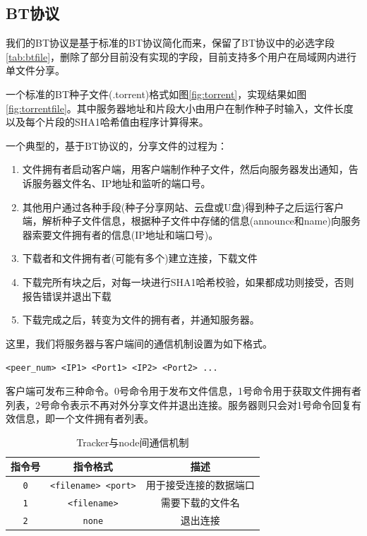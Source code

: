 \documentclass[thesis]{thesis}
\begin{document}
	\subsection{BT协议}
	\label{sub:bt}
	我们的BT协议是基于标准的BT协议简化而来，保留了BT协议中的必选字段\ref{tab:btfile}，删除了部分目前没有实现的字段，目前支持多个用户在局域网内进行单文件分享。
	
	一个标准的BT种子文件(.torrent)格式如图\ref{fig:torrent}，实现结果如图\ref{fig:torrentfile}。其中服务器地址和片段大小由用户在制作种子时输入，文件长度以及每个片段的SHA1哈希值由程序计算得来。
	
	一个典型的，基于BT协议的，分享文件的过程为：
	\begin{enumerate}
		\item 文件拥有者启动客户端，用客户端制作种子文件，然后向服务器发出通知，告诉服务器文件名、IP地址和监听的端口号。
		\item  其他用户通过各种手段(种子分享网站、云盘或U盘)得到种子之后运行客户端，解析种子文件信息，根据种子文件中存储的信息(announce和name)向服务器索要文件拥有者的信息(IP地址和端口号)。
		\item 下载者和文件拥有者(可能有多个)建立连接，下载文件
		\item 下载完所有块之后，对每一块进行SHA1哈希校验，如果都成功则接受，否则报告错误并退出下载
		\item 下载完成之后，转变为文件的拥有者，并通知服务器。
	\end{enumerate}
	
	
	这里，我们将服务器与客户端间的通信机制设置为如下格式。
	\begin{center}
		\verb'<peer_num> <IP1> <Port1> <IP2> <Port2> ...'
	\end{center}
	客户端可发布三种命令。0号命令用于发布文件信息，1号命令用于获取文件拥有者列表，2号命令表示不再对外分享文件并退出连接。服务器则只会对1号命令回复有效信息，即一个文件拥有者列表。
	
	\begin{table}[htbp]
		\caption{Tracker与node间通信机制}
		\label{tab:r}
		\centering
		\begin{tabular}{|c|c|c|}\hline
			\textbf{指令号} & \textbf{指令格式} & \textbf{描述}\\\hline
			\verb'0' & \verb'<filename> <port>' & 用于接受连接的数据端口\\\hline
			\verb'1' & \verb'<filename>'& 需要下载的文件名\\\hline
			\verb'2' & \verb'none' & 退出连接\\\hline
		\end{tabular}
	\end{table}
	
\end{document}
